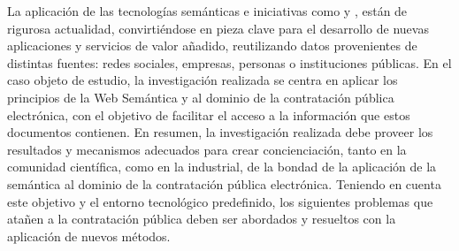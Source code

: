 \documentclass[a4paper,final,11pt,fleqn,twoside]{book}  %
\begin{document}
La aplicación de las tecnologías semánticas e iniciativas como \opendata y
\linkeddata, están de rigurosa actualidad, convirtiéndose en pieza clave
para el desarrollo de nuevas aplicaciones y servicios de valor añadido,
reutilizando datos provenientes de distintas fuentes: redes sociales, empresas,
personas o instituciones públicas. En el caso objeto de estudio, la investigación
realizada se centra en aplicar los principios de la Web Semántica y \linkeddata al dominio
de la contratación pública electrónica, con el objetivo de facilitar el acceso a la información que estos
documentos contienen. En resumen, la investigación realizada debe proveer los resultados y mecanismos
adecuados para crear concienciación, tanto en la comunidad científica, como en la industrial, de la bondad
de la aplicación de la semántica al dominio de la contratación pública electrónica. Teniendo en cuenta este objetivo y el entorno tecnológico predefinido, los siguientes
problemas que atañen a la contratación pública deben ser abordados y resueltos con la
aplicación de nuevos métodos.
\end{document}
